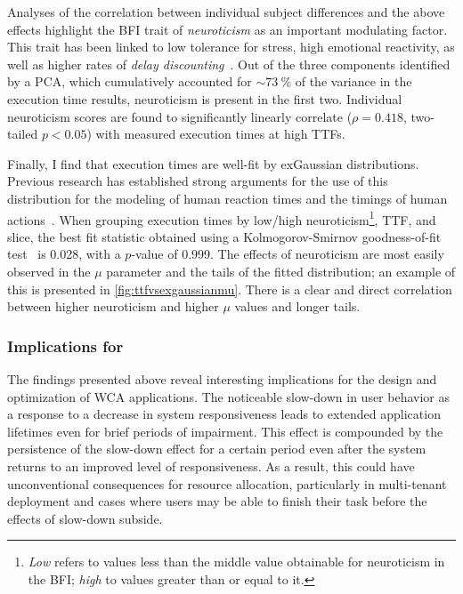 Analyses of the correlation between individual subject differences and the above effects highlight the \gls{BFI} trait of \emph{neuroticism} as an important modulating factor.
This trait has been linked to low tolerance for stress, high emotional reactivity, as well as higher rates of \emph{delay discounting}~\cite{hirsh2008delay}.
Out of the three components identified by a \gls{PCA}, which cumulatively accounted for \ensuremath{\sim\SI{73}{\percent}} of the variance in the execution time results, neuroticism is present in the first two.
Individual neuroticism scores are found to significantly linearly correlate (\ensuremath{\rho = 0.418}, two-tailed \ensuremath{p < 0.05}) with measured execution times at high \glspl{TTF}.

Finally, I find that execution times are well-fit by \gls{exGaussian} distributions.
Previous research has established strong arguments for the use of this distribution for the modeling of human reaction times and the timings of human actions~\cite{rohrer1994analysis,palmer2011what,marmolejo_ramos2022generalised}.
When grouping execution times by low/high neuroticism\footnote{%
    \emph{Low} refers to values less than the middle value obtainable for neuroticism in the \gls{BFI}; \emph{high} to values greater than or equal to it.
}, \gls{TTF}, and slice, the best fit statistic obtained using a Kolmogorov-Smirnov goodness-of-fit test~\cite{massey_jr1951kolmogorov} is \num{0.028}, with a \ensuremath{p}-value of \num{0.999}.
The effects of neuroticism are most easily observed in the \ensuremath{\mu} parameter and the tails of the fitted distribution;
an example of this is presented in \cref{fig:ttfvsexgaussianmu}.
There is a clear and direct correlation between higher neuroticism and higher \ensuremath{\mu} values and longer tails.

\subsubsection{Implications for }

The findings presented above reveal interesting implications for the design and optimization of \gls{WCA} applications.
The noticeable slow-down in user behavior as a response to a decrease in system responsiveness leads to extended application lifetimes even for brief periods of impairment.
This effect is compounded by the persistence of the slow-down effect for a certain period even after the system returns to an improved level of responsiveness.
As a result, this could have unconventional consequences for resource allocation, particularly in multi-tenant deployment and cases where users may be able to finish their task before the effects of slow-down subside.

